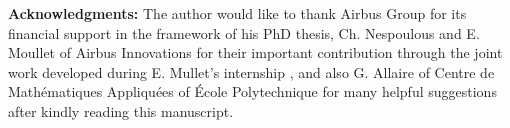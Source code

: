 \documentclass{article}
\begin{document}
\textbf{Acknowledgments:} {The author would like to thank Airbus Group for its financial support in the framework of his PhD thesis, Ch. Nespoulous and E. Moullet of Airbus Innovations for their important contribution through the joint work developed during E. Mullet's internship \cite{etienne}, and also G. Allaire of Centre de Math\'ematiques Appliqu\'ees of \'Ecole Polytechnique for many helpful suggestions after kindly reading this manuscript.}

\newpage


\end{document}
